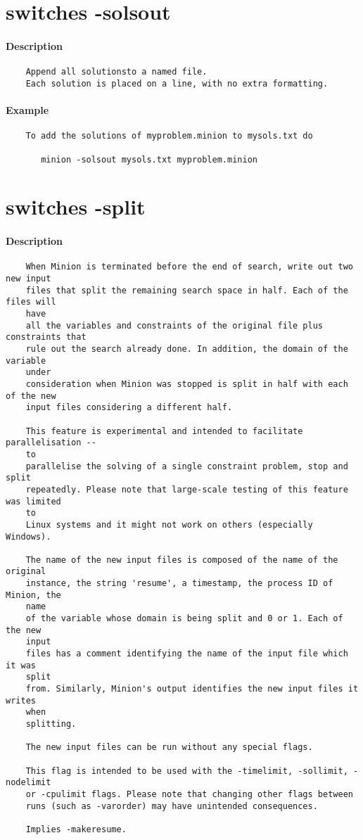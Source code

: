 \section{switches -solsout}
\paragraph{Description}
{\footnotesize
\begin{verbatim}
    Append all solutionsto a named file.
    Each solution is placed on a line, with no extra formatting.
\end{verbatim}
}
\paragraph{Example}
{\footnotesize
\begin{verbatim}
    To add the solutions of myproblem.minion to mysols.txt do

       minion -solsout mysols.txt myproblem.minion
\end{verbatim}
}
\section{switches -split}
\paragraph{Description}
{\footnotesize
\begin{verbatim}
    When Minion is terminated before the end of search, write out two new input
    files that split the remaining search space in half. Each of the files will
    have
    all the variables and constraints of the original file plus constraints that
    rule out the search already done. In addition, the domain of the variable
    under
    consideration when Minion was stopped is split in half with each of the new
    input files considering a different half.

    This feature is experimental and intended to facilitate parallelisation --
    to
    parallelise the solving of a single constraint problem, stop and split
    repeatedly. Please note that large-scale testing of this feature was limited
    to
    Linux systems and it might not work on others (especially Windows).

    The name of the new input files is composed of the name of the original
    instance, the string 'resume', a timestamp, the process ID of Minion, the
    name
    of the variable whose domain is being split and 0 or 1. Each of the new
    input
    files has a comment identifying the name of the input file which it was
    split
    from. Similarly, Minion's output identifies the new input files it writes
    when
    splitting.

    The new input files can be run without any special flags.

    This flag is intended to be used with the -timelimit, -sollimit, -nodelimit
    or -cpulimit flags. Please note that changing other flags between
    runs (such as -varorder) may have unintended consequences.

    Implies -makeresume.
\end{verbatim}
}
